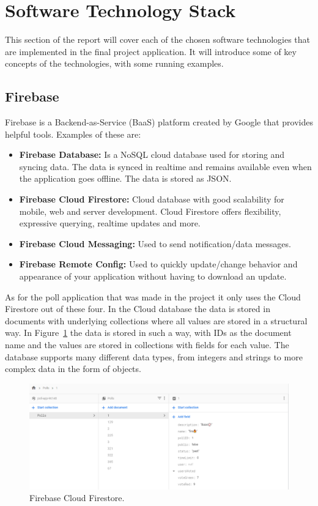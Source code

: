 \section{Software Technology Stack}
\label{sec:technology}

This section of the report will cover each of the chosen software technologies that are implemented in the final project application. It will introduce some of key concepts of the technologies, with some running examples. 



\subsection{Firebase}
\label{sub:firebase}
Firebase is a Backend-as-Service (BaaS) platform created by Google that provides helpful tools. Examples of these are:

\begin{itemize}
 \item \textbf{Firebase Database:} Is a NoSQL cloud database used for storing and syncing data. The data is synced in realtime and remains available even when the application goes offline. The data is stored as JSON. \cite{firebasedb}
 \item \textbf{Firebase Cloud Firestore:} Cloud database with good scalability for mobile, web and server development. Cloud Firestore offers flexibility, expressive querying, realtime updates and more. \cite{firebasefs}
 \item \textbf{Firebase Cloud Messaging:} Used to send notification/data messages. \cite{firebasecm}
 \item \textbf{Firebase Remote Config:} Used to quickly update/change behavior and appearance of your application without having to download an update. \cite{firebaserc}
\end{itemize}
As for the poll application that was made in the project it only uses the Cloud Firestore out of these four. In the Cloud database the data is stored in documents with underlying collections where all values are stored in a structural way. In Figure~\ref{fig:fb} the data is stored in such a way, with IDs as the document name and the values are stored in collections with fields for each value. The database supports many different data types, from integers and strings to more complex data in the form of objects.
\begin{figure}[H]
  \centering
  \includegraphics[scale=0.4]{figs/fb.png}
  \caption[scale=0.5]{Firebase Cloud Firestore.}
  \label{fig:fb}
\end{figure}



